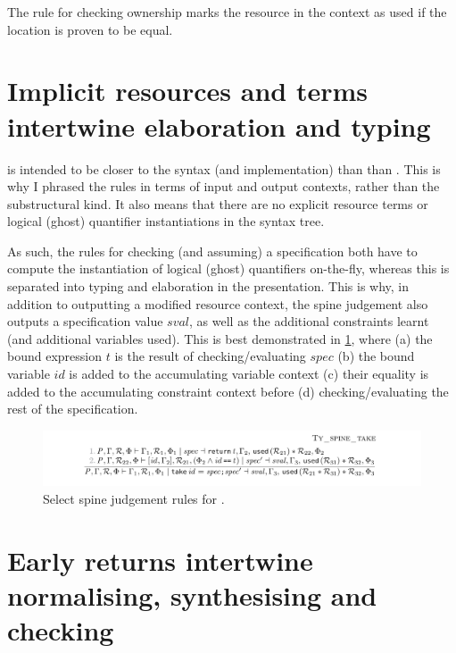 The rule for checking ownership marks the resource in the context as
used if the location is proven to be equal.

\section{Implicit resources and terms intertwine elaboration and typing}

 is intended to be closer to the syntax (and implementation) than
than . This is why I phrased the rules in terms of input and
output contexts, rather than the substructural kind. It also means that there
are no explicit resource terms or logical (ghost) quantifier instantiations in
the syntax tree.

As such, the rules for checking (and assuming) a specification both have to
compute the instantiation of logical (ghost) quantifiers on-the-fly, whereas
this is separated into typing and elaboration in the 
presentation. This is why, in addition to outputting a modified resource
context, the spine judgement also outputs a specification value
$\mathit{sval}$, as well as the additional constraints learnt (and additional
variables used). This is best demonstrated in \cref{fig:minicn-spine-take},
where (a) the bound expression $\mathit{t}$ is the result of
checking/evaluating $\mathit{spec}$ (b) the bound variable $\mathit{id}$ is
added to the accumulating variable context (c) their equality is added to the
accumulating constraint context before (d) checking/evaluating the rest of the
specification.

\begin{figure}[tpb]
    \ContinuedFloat{}
    \includegraphics{figures/minicn-spine-3}
    \caption{Select spine judgement rules for .}\label{fig:minicn-spine-take}
\end{figure}

\section{Early returns intertwine normalising, synthesising and checking}

